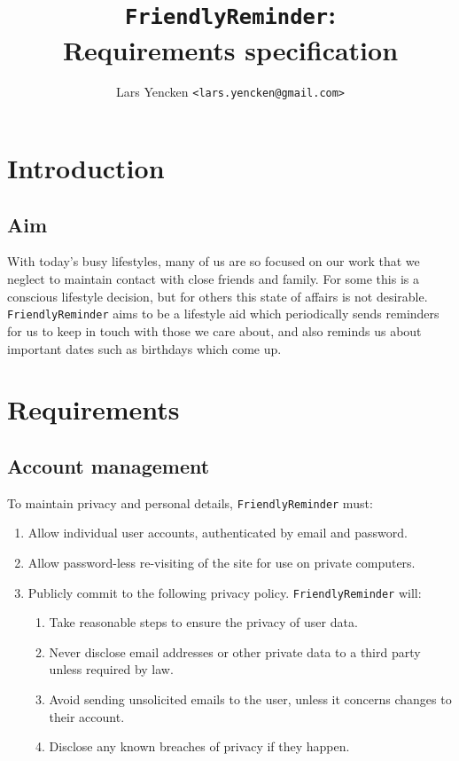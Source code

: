\documentclass[11pt]{article}
\title{{\tt FriendlyReminder}: \\Requirements specification}
\author{Lars Yencken {\tt <lars.yencken@gmail.com>}}
\newcommand{\projname}{{\tt FriendlyReminder}}
\begin{document}
\maketitle
\section{Introduction}
\subsection{Aim}

With today's busy lifestyles, many of us are so focused on our work that we neglect to maintain contact with close friends and family. For some this is a conscious lifestyle decision, but for others this state of affairs is not desirable. \projname{} aims to be a lifestyle aid which periodically sends reminders for us to keep in touch with those we care about, and also reminds us about important dates such as birthdays which come up.

\section{Requirements}

\subsection{Account management}
To maintain privacy and personal details, \projname{} must:
\begin{enumerate}
	\item Allow individual user accounts, authenticated by email and password.
	\item Allow password-less re-visiting of the site for use on private computers.
	\item Publicly commit to the following privacy policy. \projname{} will:
	\begin{enumerate}
		\item Take reasonable steps to ensure the privacy of user data.
		\item Never disclose email addresses or other private data to a third party unless required by law.
		\item Avoid sending unsolicited emails to the user, unless it concerns changes to their account.
		\item Disclose any known breaches of privacy if they happen.
	\end{enumerate}
\end{enumerate}
\end{document}
